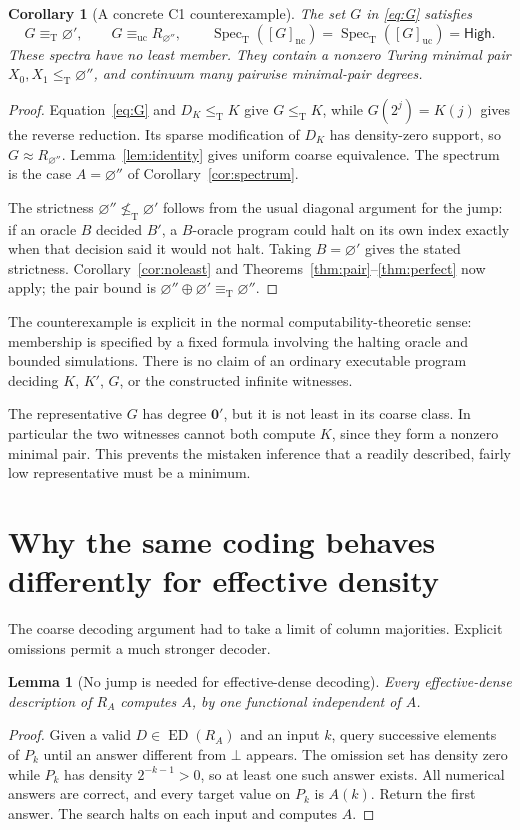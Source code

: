 \documentclass[11pt,a4paper]{article}
\newcommand{\leT}{\leq_{\mathrm T}}
\newcommand{\nleT}{\nleq_{\mathrm T}}
\newcommand{\eqT}{\equiv_{\mathrm T}}
\newcommand{\Spec}{\operatorname{Spec}_{\mathrm T}}
\newcommand{\ED}{\operatorname{ED}}
\newcommand{\nc}{\mathrm{nc}}
\newcommand{\uc}{\mathrm{uc}}
\newcommand{\zero}{\mathbf 0}
\newcommand{\High}{\mathsf{High}}
\newtheorem{lemma}[theorem]{Lemma}
\newtheorem{corollary}[theorem]{Corollary}
\theoremstyle{definition}\newtheorem{definition}[theorem]{Definition}
\theoremstyle{remark}\newtheorem{remark}[theorem]{Remark}
\begin{document}
\begin{corollary}[A concrete C1 counterexample]\label{cor:G}
The set $G$ in \eqref{eq:G} satisfies
\[
 G\eqT\varnothing',\qquad
 G\equiv_\uc R_{\varnothing''},\qquad
 \Spec([G]_\nc)=\Spec([G]_\uc)=\High.
\]
These spectra have no least member. They contain a nonzero Turing minimal pair $X_0,X_1\leT\varnothing''$, and continuum many pairwise minimal-pair degrees.
\end{corollary}
\begin{proof}
Equation~\eqref{eq:G} and $D_K\leT K$ give $G\leT K$, while $G(2^j)=K(j)$ gives the reverse reduction. Its sparse modification of $D_K$ has density-zero support, so $G\approx R_{\varnothing''}$. Lemma~\ref{lem:identity} gives uniform coarse equivalence. The spectrum is the case $A=\varnothing''$ of Corollary~\ref{cor:spectrum}.

The strictness $\varnothing''\nleT\varnothing'$ follows from the usual diagonal argument for the jump: if an oracle $B$ decided $B'$, a $B$-oracle program could halt on its own index exactly when that decision said it would not halt. Taking $B=\varnothing'$ gives the stated strictness. Corollary~\ref{cor:noleast} and Theorems~\ref{thm:pair}--\ref{thm:perfect} now apply; the pair bound is $\varnothing''\oplus\varnothing'\eqT\varnothing''$.
\end{proof}

The counterexample is explicit in the normal computability-theoretic sense: membership is specified by a fixed formula involving the halting oracle and bounded simulations. There is no claim of an ordinary executable program deciding $K$, $K'$, $G$, or the constructed infinite witnesses.

The representative $G$ has degree $\zero'$, but it is not least in its coarse class. In particular the two witnesses cannot both compute $K$, since they form a nonzero minimal pair. This prevents the mistaken inference that a readily described, fairly low representative must be a minimum.

\section{Why the same coding behaves differently for effective density}
\label{sec:ed}
The coarse decoding argument had to take a limit of column majorities. Explicit omissions permit a much stronger decoder.

\begin{lemma}[No jump is needed for effective-dense decoding]\label{lem:eddecode}
Every effective-dense description of $R_A$ computes $A$, by one functional independent of $A$.
\end{lemma}
\begin{proof}
Given a valid $D\in\ED(R_A)$ and an input $k$, query successive elements of $P_k$ until an answer different from $\bot$ appears. The omission set has density zero while $P_k$ has density $2^{-k-1}>0$, so at least one such answer exists. All numerical answers are correct, and every target value on $P_k$ is $A(k)$. Return the first answer. The search halts on each input and computes $A$.
\end{proof}
\end{document}
